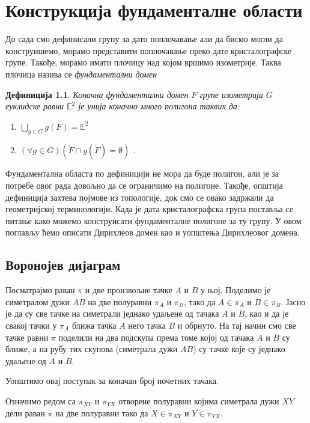 \documentclass[12pt]{report}
\newtheorem{definition}[theorem]{\bf Дефиниција}
\begin{document}
\chapter{Конструкција фундаменталне области}\label{dirihleova-fundamentalna-oblast} 

До сада смо дефинисали групу за дато поплочавање али да бисмо могли да конструишемо, морамо представити поплочавање преко дате кристалографске групе. Такође, морамо имати плочицу над којом вршимо изометрије. Таква плочица назива се \emph{фундаментални домен}

\begin{definition} Коначна фундаментални домен \(F\) групе изометрија \(G\) еуклидске равни \(\mathbb{E}^2\) је унија коначно много полигона таквих да:\\
\begin{enumerate}
\item \(\displaystyle{\bigcup_{g\in G}g(F)} = \mathbb{E}^2\) 
\item \((\forall g\in G)(\mathring{F} \cap g(\mathring{F})= \emptyset)\) .
\end{enumerate}

\end{definition}
Фундаментална областа по дефиницији не мора да буде
полигон, али је за потребе овог рада довољно да се ограничимо на
полигоне. Такође, општија дефиниција захтева појмове из топологије,
док смо се овако задржали да геометријској терминологији.
Када је дата кристалографска група поставља се питање како можемо конструисати фундаменталне полигоне за ту групу. У овом поглављу ћемо описати Дирихлеов домен као и уопштења Дирихлеовог домена.
\section{Воронојев дијаграм}


Посматрајмо раван $\pi$ и две произвољне тачке $A$ и $B$ у њој. Поделимо је симетралом дужи $AB$ на две полуравни $\pi _A$ и $\pi _B$, тако да $A \in \pi _ A$ и $B \in \pi _B$. Јасно је да су све тачке на симетрали једнако удаљене од тачака $A$ и $B$, као и да је свакој тачки у $\pi _A$ ближа тачка $A$ него тачка $B$ и обрнуто. 
На тај начин смо све тачке равни $\pi$ поделили на два подскупа према томе којој од тачака $A$ и $B$ су ближе, а на рубу тих скупова (симетрала дужи $AB$) су тачке које су једнако удаљене од $A$ и $B$.

Уопштимо овај поступак за коначан број почетних тачака.

Означимо редом са $\pi _{XY}$ и $\pi _{YX}$ отворене полуравни којима симетрала дужи $XY$ дели раван $\pi$ на две полуравни тако да $X \in \pi _ {XY}$ и $Y \in \pi _{YX}$. 
\end{document}
